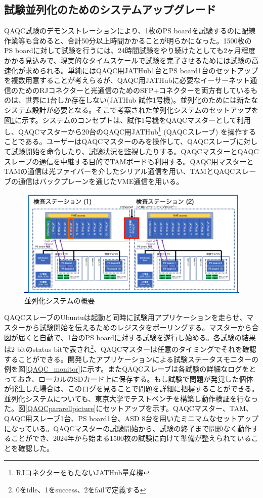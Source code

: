 \subsection{試験並列化のためのシステムアップグレード}
\label{subsec_parallel}
QAQC試験のデモンストレーションにより、1枚のPS boardを試験するのに配線作業等も含めると、合計50分以上時間かかることが明らかになった。1500枚のPS boardに対して試験を行うには、24時間試験をやり続けたとしても2ヶ月程度かかる見込みで、現実的なタイムスケールで試験を完了させるためには試験の高速化が求められる。単純にはQAQC用JATHub1台とPS board1台のセットアップを複数用意することが考えらるが、QAQC用JATHubに必要なイーサーネット通信のためのRJコネクターと光通信のためのSFP+コネクターを両方有しているものは、世界に1台しか存在しない(JATHub 試作1号機)。並列化のためには新たなシステム設計が必要となる。そこで考案された並列化システムのセットアップを図\ref{QAQCpararell}に示す。システムのコンセプトは、試作1号機をQAQCマスターとして利用し、QAQCマスターから20台のQAQC用JATHub\footnote{RJコネクターをもたないJATHub量産機} (QAQCスレーブ) を操作することである。ユーザーはQAQCマスターのみを操作して、QAQCスレーブに対して試験開始を命令したり、試験状況を監視したりする。QAQCマスターとQAQCスレーブの通信を中継する目的でTAMボードも利用する。QAQC用マスターとTAMの通信は光ファイバーを介したシリアル通信を用い、TAMとQAQCスレーブの通信はバックプレーンを通じたVME通信を用いる。
\begin{figure} 
    \centering
    \includegraphics[width=16cm]{fig/QAQC/QAQCpararell.png}
    \caption[並列化システムの概要]{並列化システムの概要}
    \label{QAQCpararell}
\end{figure}

QAQCスレーブのUbuntuは起動と同時に試験用アプリケーションを走らせ、マスターから試験開始を伝えるためのレジスタをポーリングする。マスターから合図が届くと自動で、1台のPS boardに対する試験を遂行し始める。各試験の結果は2 bitのstatus bitで表され\footnote{0をidle、1をsuccess、2をfailで定義する}、QAQCマスターは任意のタイミングでそれを確認することができる。開発したアプリケーションによる試験ステータスモニターの例を図\ref{QAQC_monitor}に示す。またQAQCスレーブは各試験の詳細なログをとっておき、ローカルのSDカード上に保存する。もし試験で問題が発覚した個体が発生した場合は、このログを見ることで問題を詳細に把握することができる。
並列化システムについても、東京大学でテストベンチを構築し動作検証を行なった。図\ref{QAQCpararellpicture}にセットアップを示す。QAQCマスター、TAM、QAQC用スレーブ1台、PS board1台、ASD 8台を用いたミニマムなセットアップになっている。QAQCマスターの試験開始から、試験の終了まで問題なく動作することができ、2024年から始まる1500枚の試験に向けて準備が整えられていることを確認した。

